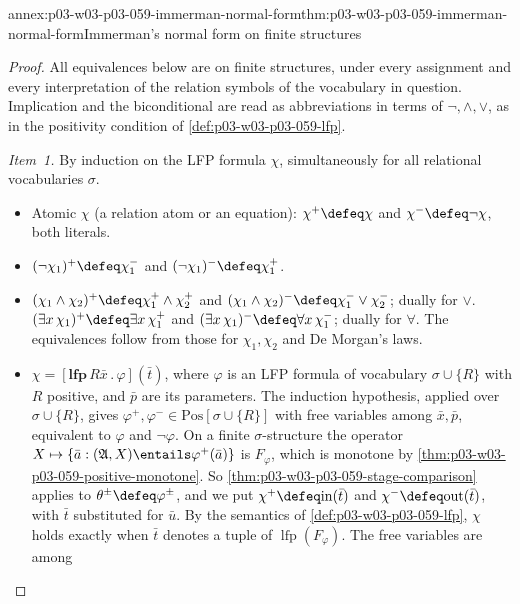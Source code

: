 \begin{annexitem}{annex:p03-w03-p03-059-immerman-normal-form}{thm:p03-w03-p03-059-immerman-normal-form}{Immerman's normal form on finite structures}
\begin{proof}
All equivalences below are on finite structures, under every assignment
and every interpretation of the relation symbols of the vocabulary in
question. Implication and the biconditional are read as abbreviations in
terms of \(\neg,\land,\lor\), as in the positivity condition of
\cref{def:p03-w03-p03-059-lfp}.

\emph{Item~1.} By induction on the LFP formula \(\chi\), simultaneously for
all relational vocabularies \(\sigma\).
\begin{itemize}
 \item Atomic \(\chi\) (a relation atom or an equation): \(\chi^+\defeq\chi\)
       and \(\chi^-\defeq\neg\chi\), both literals.
 \item \((\neg\chi_1)^+\defeq\chi_1^-\) and
       \((\neg\chi_1)^-\defeq\chi_1^+\).
 \item \((\chi_1\land\chi_2)^+\defeq\chi_1^+\land\chi_2^+\) and
       \((\chi_1\land\chi_2)^-\defeq\chi_1^-\lor\chi_2^-\); dually for
       \(\lor\). \((\exists x\,\chi_1)^+\defeq\exists x\,\chi_1^+\) and
       \((\exists x\,\chi_1)^-\defeq\forall x\,\chi_1^-\); dually for
       \(\forall\). The equivalences follow from those for \(\chi_1,\chi_2\)
       and De Morgan's laws.
 \item \(\chi=[\mathbf{lfp}\,R\bar x\,.\,\varphi](\bar t)\), where
       \(\varphi\) is an LFP formula of vocabulary \(\sigma\cup\{R\}\) with
       \(R\) positive, and \(\bar p\) are its parameters. The induction
       hypothesis, applied over \(\sigma\cup\{R\}\), gives
       \(\varphi^+,\varphi^-\in\mathrm{Pos}[\sigma\cup\{R\}]\) with free
       variables among \(\bar x,\bar p\), equivalent to \(\varphi\) and
       \(\neg\varphi\). On a finite \(\sigma\)-structure the operator
       \(X\mapsto\{\bar a:(\mathfrak A,X)\entails\varphi^+(\bar a)\}\) is
       \(F_\varphi\), which is monotone by
       \cref{thm:p03-w03-p03-059-positive-monotone}. So
       \cref{thm:p03-w03-p03-059-stage-comparison} applies to
       \(\theta^\pm\defeq\varphi^\pm\), and we put
       \(\chi^+\defeq\mathrm{in}(\bar t)\) and
       \(\chi^-\defeq\mathrm{out}(\bar t)\), with \(\bar t\) substituted
       for \(\bar u\). By the semantics of \cref{def:p03-w03-p03-059-lfp},
       \(\chi\) holds exactly when \(\bar t\) denotes a tuple of
       \(\operatorname{lfp}(F_\varphi)\). The free variables are among

\end{itemize}
\end{proof}
\end{annexitem}
